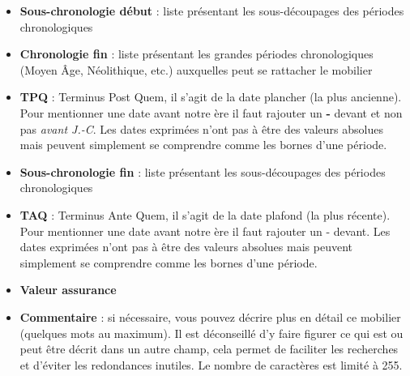 \documentclass[letterpaper,10pt,french]{sphinxmanual}
\begin{document}
\begin{itemize}
\item {} 
\textbf{Sous-chronologie début} : liste présentant les sous-découpages des périodes chronologiques

\item {} 
\textbf{Chronologie fin} : liste présentant les grandes périodes chronologiques (Moyen Âge, Néolithique, etc.) auxquelles peut se rattacher le mobilier

\item {} 
\textbf{TPQ} : Terminus Post Quem, il s'agit de la date plancher (la plus ancienne). Pour mentionner une date avant notre ère il faut rajouter un \textbf{-} devant et non pas \emph{avant J.-C}. Les dates exprimées n'ont pas à être des valeurs absolues mais peuvent simplement se comprendre comme les bornes d'une période.

\item {} 
\textbf{Sous-chronologie fin} : liste présentant les sous-découpages des périodes chronologiques

\item {} 
\textbf{TAQ} : Terminus Ante Quem, il s'agit de la date plafond (la plus récente). Pour mentionner une date avant notre ère il faut rajouter un - devant. Les dates exprimées n'ont pas à être des valeurs absolues mais peuvent simplement se comprendre comme les bornes d'une période.

\item {} 
\textbf{Valeur assurance}

\item {} 
\textbf{Commentaire} : si nécessaire, vous pouvez décrire plus en détail ce mobilier (quelques mots au maximum). Il est déconseillé d'y faire figurer ce qui est ou peut être décrit dans un autre champ, cela permet de faciliter les recherches et d'éviter les redondances inutiles. Le nombre de caractères est limité à 255.

\end{itemize}
\end{document}
